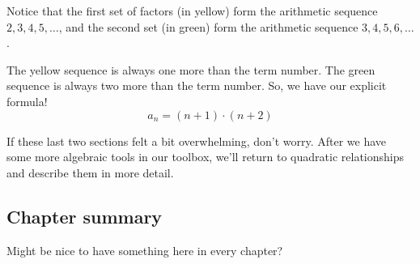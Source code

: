 \begin{boxedex}
Notice that the first set of factors (in yellow) form the arithmetic sequence $2, 3, 4, 5, \dotsc$, and the second set (in green) form the arithmetic sequence $3, 4, 5, 6, \dotsc$.

The yellow sequence is always one more than the term number. The green sequence is always two more than the term number. So, we have our explicit formula! \[a_n = (n+1)\cdot(n+2)\]
\end{boxedex}

If these last two sections felt a bit overwhelming, don't worry. After we have some more algebraic tools in our toolbox, we'll return to quadratic relationships and describe them in more detail.


\subsection*{Chapter summary}

Might be nice to have something here in every chapter?
